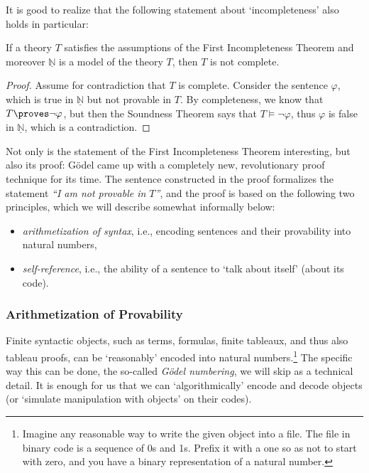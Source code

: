     It is good to realize that the following statement about `incompleteness' also holds in particular:
    
    \begin{corollary}
        If a theory $T$ satisfies the assumptions of the First Incompleteness Theorem and moreover $\underline{\mathbb N}$ is a model of the theory $T$, then $T$ is not complete.
    \end{corollary}
    \begin{proof}
        Assume for contradiction that $T$ is complete. Consider the sentence $\varphi$, which is true in $\underline{\mathbb N}$ but not provable in $T$. By completeness, we know that $T\proves\neg\varphi$, but then the Soundness Theorem says that $T\models\neg\varphi$, thus $\varphi$ is false in $\underline{\mathbb N}$, which is a contradiction.
    \end{proof}
    
    Not only is the statement of the First Incompleteness Theorem interesting, but also its proof: Gödel came up with a completely new, revolutionary proof technique for its time. The sentence constructed in the proof formalizes the statement \emph{``I am not provable in $T$''}, and the proof is based on the following two principles, which we will describe somewhat informally below:
    \begin{itemize}
        \item \emph{arithmetization of syntax}, i.e., encoding sentences and their provability into natural numbers,
        \item \emph{self-reference}, i.e., the ability of a sentence to `talk about itself' (about its code).
    \end{itemize}
    
    \subsubsection*{Arithmetization of Provability}
    
    Finite syntactic objects, such as terms, formulas, finite tableaux, and thus also tableau proofs, can be `reasonably' encoded into natural numbers.\footnote{Imagine any reasonable way to write the given object into a file. The file in binary code is a sequence of 0s and 1s. Prefix it with a one so as not to start with zero, and you have a binary representation of a natural number.} The specific way this can be done, the so-called \emph{Gödel numbering}, we will skip as a technical detail. It is enough for us that we can `algorithmically' encode and decode objects (or `simulate manipulation with objects' on their codes).
    
